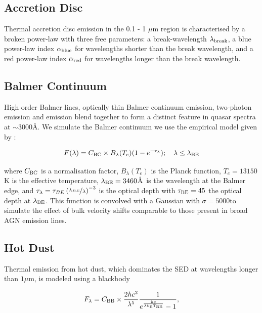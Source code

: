 \subsection{Accretion Disc}

Thermal accretion disc emission in the 0.1 - 1 $\mu$m region is characterised by a broken power-law with three free parameters: a break-wavelength $\lambda_{\rm break}$, a blue power-law index $\alpha_{\rm blue}$ for wavelengths shorter than the break wavelength, and a red power-law index $\alpha_{\rm red}$ for wavelengths longer than the break wavelength.

\subsection{Balmer Continuum}

High order Balmer lines, optically thin Balmer continuum emission, two-photon emission and  emission blend together to form a distinct feature in quasar spectra at $\sim3000$\AA. 
We simulate the Balmer continuum we use the empirical model given by \citet{grandi82}: 

\begin{equation}
  F(\lambda) = C_{\rm BC} \times B_\lambda(T_e)(1-e^{-\tau_\lambda}); \quad \lambda \leq \lambda_{\rm BE}
\end{equation}

where $C_{\rm BC}$ is a normalisation factor, $B_\lambda(T_e)$ is the Planck function, $T_e=13150$K is the effective temperature, $\lambda_{\rm BE}=3460$\AA\, is the wavelength at the Balmer edge, and $\tau_\lambda = \tau_{BE}\left( \nicefrac{\lambda_{BE}} {\lambda} \right)^{-3}$ is the optical depth with $\tau_{\rm BE}=45$ the optical depth at $\lambda_{\rm BE}$. 
This function is convolved with a Gaussian with $\sigma=5000$\kms to simulate the effect of bulk velocity shifts comparable to those present in broad \ac{AGN} emission lines. 

\subsection{Hot Dust}

Thermal emission from hot dust, which dominates the \ac{SED} at wavelengths longer than $1\mu$m, is modeled using a blackbody

\begin{eqnarray}  
  F_\lambda = C_{\rm BB} \times \frac{2 hc^2}{\lambda^5}\frac{1}{ e^{\frac{hc}{\lambda k_\mathrm{B}T_{\rm BB}}} - 1}, 
\end{eqnarray}

